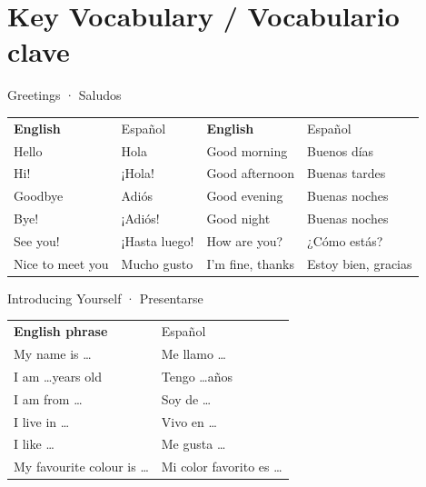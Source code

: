 
\section{Key Vocabulary / Vocabulario clave}

\begin{vocabcard}{Greetings · Saludos}
\begin{center}
\begin{tabular}{ll@{\qquad}ll}
\bfseries\color{kidsBlue}English & \color{kidsGray}Español &
\bfseries\color{kidsBlue}English & \color{kidsGray}Español \\[4pt]
Hello       & Hola           & Good morning  & Buenos días    \\
Hi!         & ¡Hola!         & Good afternoon& Buenas tardes  \\
Goodbye     & Adiós          & Good evening  & Buenas noches  \\
Bye!        & ¡Adiós!        & Good night    & Buenas noches  \\
See you!    & ¡Hasta luego!  & How are you?  & ¿Cómo estás?   \\
Nice to meet you & Mucho gusto & I'm fine, thanks & Estoy bien, gracias \\
\end{tabular}
\end{center}
\end{vocabcard}

\vspace{12pt}

\begin{vocabcard}[colframe=kidsPurple, colbacktitle=kidsPurple]{Introducing Yourself · Presentarse}
\begin{center}
\begin{tabular}{ll}
\bfseries\color{kidsPurple}English phrase & \color{kidsGray}Español \\[4pt]
My name is \ldots     & Me llamo \ldots        \\
I am \ldots years old & Tengo \ldots años      \\
I am from \ldots      & Soy de \ldots          \\
I live in \ldots      & Vivo en \ldots         \\
I like \ldots         & Me gusta \ldots        \\
My favourite colour is \ldots & Mi color favorito es \ldots \\
\end{tabular}
\end{center}
\end{vocabcard}


